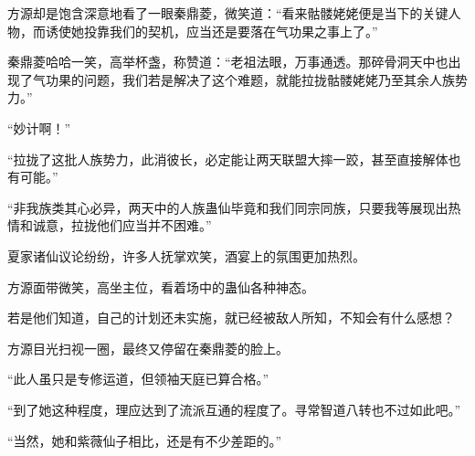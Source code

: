 \begin{this_body}
方源却是饱含深意地看了一眼秦鼎菱，微笑道：“看来骷髅姥姥便是当下的关键人物，而诱使她投靠我们的契机，应当还是要落在气功果之事上了。”

秦鼎菱哈哈一笑，高举杯盏，称赞道：“老祖法眼，万事通透。那碎骨洞天中也出现了气功果的问题，我们若是解决了这个难题，就能拉拢骷髅姥姥乃至其余人族势力。”

“妙计啊！”

“拉拢了这批人族势力，此消彼长，必定能让两天联盟大摔一跤，甚至直接解体也有可能。”

“非我族类其心必异，两天中的人族蛊仙毕竟和我们同宗同族，只要我等展现出热情和诚意，拉拢他们应当并不困难。”

夏家诸仙议论纷纷，许多人抚掌欢笑，酒宴上的氛围更加热烈。

方源面带微笑，高坐主位，看着场中的蛊仙各种神态。

若是他们知道，自己的计划还未实施，就已经被敌人所知，不知会有什么感想？

方源目光扫视一圈，最终又停留在秦鼎菱的脸上。

“此人虽只是专修运道，但领袖天庭已算合格。”

“到了她这种程度，理应达到了流派互通的程度了。寻常智道八转也不过如此吧。”

“当然，她和紫薇仙子相比，还是有不少差距的。”

\end{this_body}


